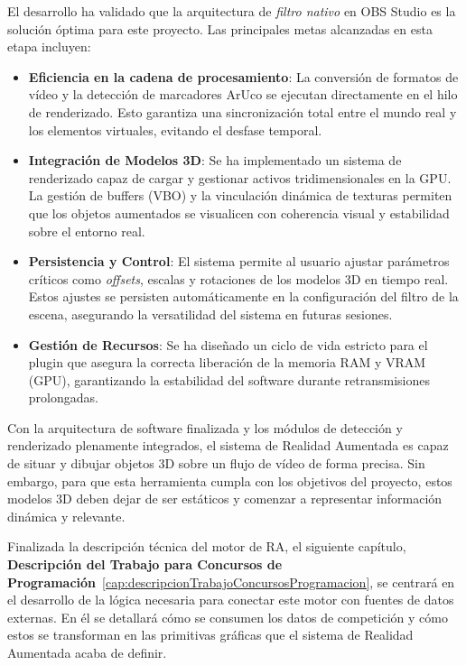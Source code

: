 El desarrollo ha validado que la arquitectura de \textit{filtro nativo} en OBS Studio es la solución óptima para este proyecto. Las principales metas alcanzadas en esta etapa incluyen:

\begin{itemize}
    \item \textbf{Eficiencia en la cadena de procesamiento}: La conversión de formatos de vídeo y la detección de marcadores ArUco se ejecutan directamente en el hilo de renderizado. Esto garantiza una sincronización total entre el mundo real y los elementos virtuales, evitando el desfase temporal.
    \item \textbf{Integración de Modelos 3D}: Se ha implementado un sistema de renderizado capaz de cargar y gestionar activos tridimensionales en la GPU. La gestión de buffers (VBO) y la vinculación dinámica de texturas permiten que los objetos aumentados se visualicen con coherencia visual y estabilidad sobre el entorno real.
    \item \textbf{Persistencia y Control}: El sistema permite al usuario ajustar parámetros críticos como \textit{offsets}, escalas y rotaciones de los modelos 3D en tiempo real. Estos ajustes se persisten automáticamente en la configuración del filtro de la escena, asegurando la versatilidad del sistema en futuras sesiones.
    \item \textbf{Gestión de Recursos}: Se ha diseñado un ciclo de vida estricto para el plugin que asegura la correcta liberación de la memoria RAM y VRAM (GPU), garantizando la estabilidad del software durante retransmisiones prolongadas.
\end{itemize}

Con la arquitectura de software finalizada y los módulos de detección y renderizado plenamente integrados, el sistema de Realidad Aumentada es capaz de situar y dibujar objetos 3D sobre un flujo de vídeo de forma precisa. Sin embargo, para que esta herramienta cumpla con los objetivos del proyecto, estos modelos 3D deben dejar de ser estáticos y comenzar a representar información dinámica y relevante.

Finalizada la descripción técnica del motor de RA, el siguiente capítulo, \textbf{Descripción del Trabajo para Concursos de Programación}~\ref{cap:descripcionTrabajoConcursosProgramacion}, se centrará en el desarrollo de la lógica necesaria para conectar este motor con fuentes de datos externas. En él se detallará cómo se consumen los datos de competición y cómo estos se transforman en las primitivas gráficas que el sistema de Realidad Aumentada acaba de definir.
